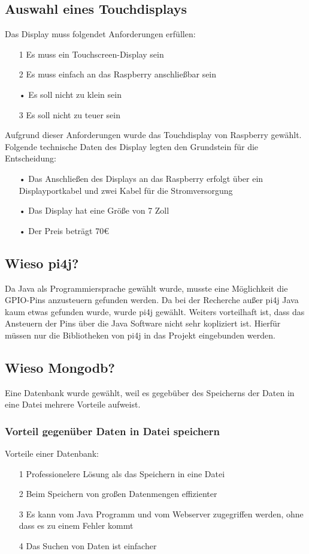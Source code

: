 \subsection{Auswahl eines Touchdisplays}
Das Display muss folgendet Anforderungen erfüllen:
\begin{itemize}
\item[1] Es muss ein Touchscreen-Display sein
\item[2] Es muss einfach an das Raspberry anschließbar sein
\item[•] Es soll nicht zu klein sein
\item[3] Es soll nicht zu teuer sein
\end{itemize}

Aufgrund dieser Anforderungen wurde das Touchdisplay von Raspberry gewählt.
\\ Folgende technische Daten des Display legten den Grundstein für die Entscheidung:
\begin{itemize}
\item[•] Das Anschließen des Displays an das Raspberry erfolgt über ein Displayportkabel und zwei Kabel für die Stromversorgung
\item[•] Das Display hat eine Größe von 7 Zoll
\item[•] Der Preis beträgt 70\euro{}
\end{itemize}

\subsection{Wieso pi4j?}
Da Java als Programmiersprache gewählt wurde, musste eine Möglichkeit die GPIO-Pins anzusteuern gefunden werden.
Da bei der Recherche außer pi4j Java kaum etwas gefunden wurde, wurde pi4j gewählt. Weiters vorteilhaft ist, dass das Ansteuern der Pins über die Java Software nicht sehr kopliziert ist. Hierfür müssen nur die Bibliotheken von pi4j in das Projekt eingebunden werden.

\subsection{Wieso Mongodb?}
Eine Datenbank wurde gewählt, weil es gegebüber des Speicherns der Daten in eine Datei mehrere Vorteile aufweist. 
\subsubsection{Vorteil gegenüber Daten in Datei speichern}
Vorteile einer Datenbank:
\begin{itemize}
\item[1] Professionelere Lösung als das Speichern in eine Datei
\item[2] Beim Speichern von großen Datenmengen effizienter
\item[3] Es kann vom Java Programm und vom Webserver zugegriffen werden, ohne dass es zu einem Fehler kommt
\item[4] Das Suchen von Daten ist einfacher
\end{itemize}
